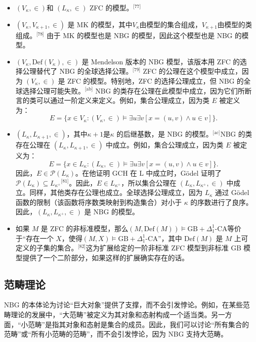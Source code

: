 \begin{itemize}
\item \((V_{\kappa}, \in)\)和 \((L_{\kappa}, \in)\) ZFC 的模型。\(^\text{[77]}\)
\item \((V_{\kappa}, V_{\kappa + 1}, \in)\) 是 MK 的模型，其中\(V_{\kappa}\)由模型的集合组成，\(V_{\kappa + 1}\)由模型的类组成。\(^\text{[78]}\)
由于 MK 的模型也是 NBG 的模型，因此这个模型也是 NBG 的模型。
\item \((V_{\kappa}, \text{Def}(V_{\kappa}), \in)\) 是 Mendelson 版本的 NBG 模型，该版本用 ZFC 的选择公理替代了 NBG 的全球选择公理。\(^\text{[79]}\)
ZFC 的公理在这个模型中成立，因为 \((V_{\kappa}, \in)\) 是 ZFC 的模型。特别地，ZFC 的选择公理成立，但 NBG 的全球选择公理可能失败。\(^\text{[ab]}\) NBG 的类存在公理在此模型中成立，因为它们所断言的类可以通过一阶定义来定义。例如，集合公理成立，因为类 \(E\) 被定义为：
\[
E = \{ x \in V_{\kappa} : (V_{\kappa}, \in) \models \exists u \exists v [x = (u,v) \land u \in v] \}.~
\]
\item \((L_{\kappa}, L_{\kappa + 1}, \in)\)，其中\(\kappa + 1\)是\(\kappa\) 的后继基数，是 NBG 的模型。\(^\text{[ac]}\)NBG 的类存在公理在 \((L_{\kappa}, L_{\kappa + 1}, \in)\) 中成立。例如，集合公理成立，因为类 \(E\) 被定义为：
\[
E = \{ x \in L_{\kappa} : (L_{\kappa}, \in) \models \exists u \exists v [x = (u,v) \land u \in v] \}.~
\]
因此，\(E \in \mathcal{P}(L_{\kappa})\)。在他证明 GCH 在 L 中成立时，Gödel 证明了 \( \mathcal{P}(L_{\kappa}) \subseteq L_{\kappa^+} \)\(^\text{[81]}\)。因此，\(E \in L_{\kappa^+}\)，所以集合公理在 \((L_{\kappa}, L_{\kappa^+}, \in)\) 中成立。同样，其他类存在公理也成立。全球选择公理成立，因为 \(L_{\kappa}\) 通过 Gödel 函数的限制（该函数将序数类映射到构造集合）对小于 \(\kappa\) 的序数进行了良序。因此，\((L_{\kappa}, L_{\kappa^+}, \in)\) 是 NBG 的模型。
\item 如果 \(M\) 是 ZFC 的非标准模型，那么\((M, \text{Def}(M)) \models \text{GB} + \Delta_1^1\text{-CA}\)等价于“存在一个 \(X\)，使得\((M, X) \models \text{GB} + \Delta_1^1\text{-CA}\)”，其中 \(\text{Def}(M)\) 是 \(M\) 上可定义的子集的集合。\(^\text{[82]}\)这为扩展给定的一阶非标准 ZFC 模型到非标准 GB 模型提供了一个二阶部分，如果这样的扩展确实存在的话。
\end{itemize}
\subsection{范畴理论}  
NBG 的本体论为讨论“巨大对象”提供了支撑，而不会引发悖论。例如，在某些范畴理论的发展中，“大范畴”被定义为其对象和态射构成一个适当类。另一方面，“小范畴”是指其对象和态射是集合的成员。因此，我们可以讨论“所有集合的范畴”或“所有小范畴的范畴”，而不会引发悖论，因为 NBG 支持大范畴。

